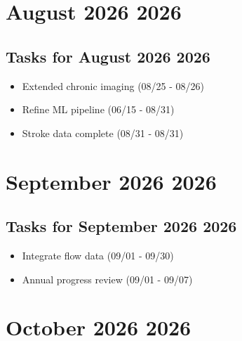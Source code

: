 \documentclass[landscape,a4paper]{article}
\begin{document}
\section*{August 2026 2026}

\begin{center}
\begin{tikzpicture}[scale=0.9]
\end{tikzpicture}
\end{center}

\vspace{1cm}

\subsection*{Tasks for August 2026 2026}
\begin{itemize}
\item Extended chronic imaging (08/25 - 08/26)
\item Refine ML pipeline (06/15 - 08/31)
\item Stroke data complete (08/31 - 08/31)
\end{itemize}
\newpage

\section*{September 2026 2026}

\begin{center}
\begin{tikzpicture}[scale=0.9]
\end{tikzpicture}
\end{center}

\vspace{1cm}

\subsection*{Tasks for September 2026 2026}
\begin{itemize}
\item Integrate flow data (09/01 - 09/30)
\item Annual progress review (09/01 - 09/07)
\end{itemize}
\newpage

\section*{October 2026 2026}
\end{document}
